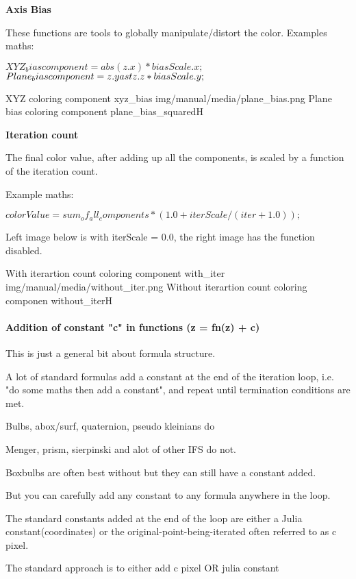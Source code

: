 \textbf{Axis Bias}

These functions are tools to globally manipulate/distort the color. 
Examples maths:

$XYZ_bias                component = abs(z.x) \ast biasScale.x;$
$Plane_bias              component = z.y \\ast z.z \ast biasScale.y;$

{XYZ coloring component}
{xyz_bias}
{img/manual/media/plane_bias.png}
{Plane bias coloring component}
{plane_bias_squared}{H}

\textbf{Iteration count}

The final color value, after adding up all the components, is  scaled by a function of the iteration count.

Example maths:

$colorValue =  sum_of_all_components *  ( 1.0 + iterScale / ( iter + 1.0));$

Left image below is with iterScale = 0.0, the right image has the function disabled.

{With iterartion count coloring component}
{with_iter}
{img/manual/media/without_iter.png}
{Without iterartion count coloring componen}
{without_iter}{H}


\paragraph{Addition of constant "c" in functions (z = fn(z) + c)}
This is just a general bit about formula structure.

A lot of standard formulas add a constant at the end of the iteration loop, i.e. "do some maths then add a constant", and repeat until termination conditions are met.

Bulbs, abox/surf, quaternion, pseudo kleinians do

Menger, prism, sierpinski and alot of other IFS do not.

Boxbulbs are often best without but they can still have a constant added.

But you can carefully add any constant to any formula anywhere in the loop.

The standard constants added at the end of the loop are either a Julia constant(coordinates) or the original-point-being-iterated often referred to as c pixel.

The standard approach is to either add c pixel OR julia constant

